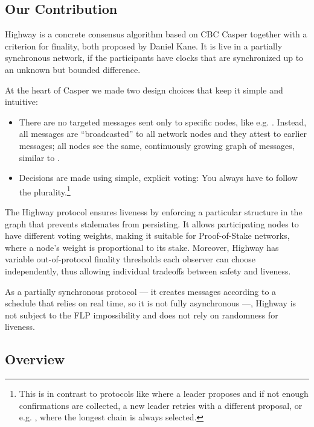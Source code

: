 \documentclass[12pt, fleqn]{article}
\begin{document}
\subsection*{Our Contribution}

Highway is a concrete consensus algorithm based on CBC Casper \cite{zamfir2018casper} together with a criterion for finality, both proposed by Daniel Kane. It is live in a partially synchronous network, if the participants have clocks that are synchronized up to an unknown but bounded difference.

At the heart of Casper we made two design choices that keep it simple and intuitive:
\begin{itemize}
  \item There are no targeted messages sent only to specific nodes, like e.g. \cite{miller2016honey}. Instead, all messages are ``broadcasted'' to all network nodes and they attest to earlier messages; all nodes see the same, continuously growing graph of messages, similar to \cite{baird2016hashgraph,chevalier2018parsec,gkagol2019aleph,moser1999byzantine}.
  \item Decisions are made using simple, explicit voting: You always have to follow the plurality.\footnote{This is in contrast to protocols like \cite{buchman2018latest,castro1999practical,muratov2018yac} where a leader proposes and if not enough confirmations are collected, a new leader retries with a different proposal, or e.g. \cite{kiayias2017ouroboros}, where the longest chain is always selected.}
\end{itemize}

The Highway protocol ensures liveness by enforcing a particular structure in the graph that prevents stalemates from persisting.
It allows participating nodes to have different voting weights, making it suitable for Proof-of-Stake networks, where a node's weight is proportional to its stake. Moreover, Highway has variable out-of-protocol finality thresholds each observer can choose independently, thus allowing individual tradeoffs between safety and liveness.

As a partially synchronous protocol --- it creates messages according to a schedule that relies on real time, so it is not fully asynchronous ---, Highway is not subject to the FLP impossibility \cite{fischer1982impossibility} and does not rely on randomness for liveness.


\subsection*{Overview}
\end{document}
